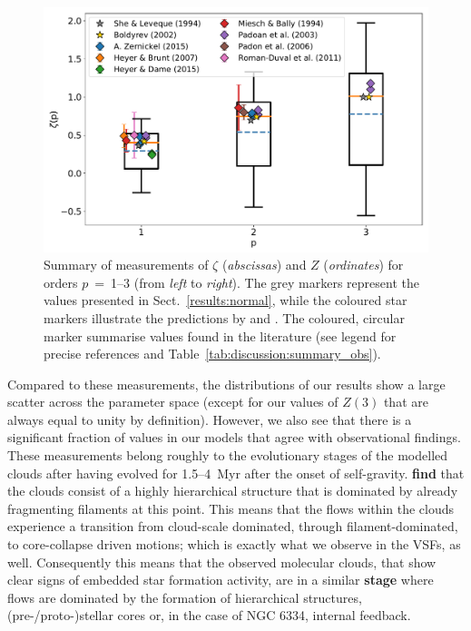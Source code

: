 \begin{figure}
	\includegraphics[width=\textwidth]{compare_observations.pdf}
	\caption{Summary of measurements of $\zeta$ (\textit{abscissas}) and $Z$ (\textit{ordinates}) for orders $p$~=~1--3 (from \textit{left} to \textit{right}). The grey markers represent the values presented in Sect.~\ref{results:normal}, while the coloured star markers illustrate the predictions by \citet{She1994} and \citet{Boldyrev2002}. The coloured, circular marker summarise values found in the literature (see legend for precise references and Table~\ref{tab:discussion:summary_obs}). 
	}
	\label{pic:discussion:comp_observation}
\end{figure}


Compared to these measurements, the distributions of our results show a large scatter across the parameter space (except for our values of $Z(3)$ that are always equal to unity by definition). 
However, we also see that there is a significant fraction of values in our models that agree with observational findings. 
These measurements belong roughly to the evolutionary stages of the modelled clouds after having evolved for 1.5--4~Myr after the onset of self-gravity.
 \textbf{find}
that the clouds consist of a highly hierarchical structure that is dominated by already fragmenting filaments at this point.
This means that the flows within the clouds experience a transition from cloud-scale dominated, through filament-dominated, to core-collapse driven motions; which is exactly what we observe in the VSFs, as well.
Consequently this means that the observed molecular clouds, that show clear signs of embedded star formation activity, are in a similar \textbf{stage} where flows are dominated by the formation of hierarchical structures, (pre-/proto-)stellar cores or, in the case of NGC 6334, internal feedback.

